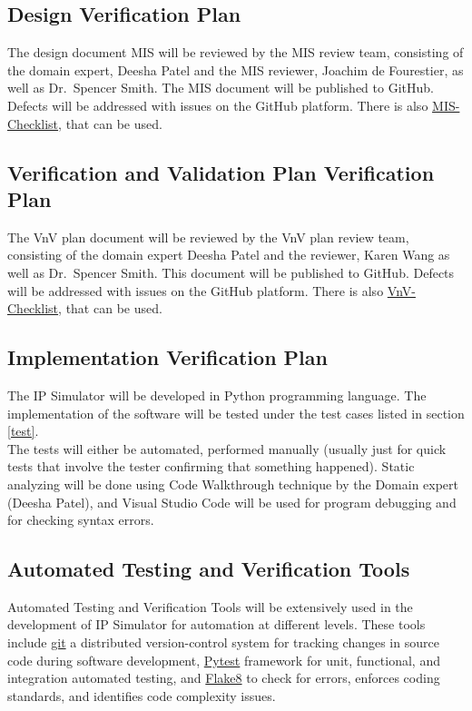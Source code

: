 \documentclass[12pt, titlepage]{article}
\begin{document}
\subsection{Design Verification Plan}

The design document MIS will be reviewed by the MIS review team, consisting of the domain expert, Deesha Patel and the MIS reviewer, Joachim de Fourestier, as well as Dr.\ Spencer Smith.
The MIS document will be published to GitHub. Defects will be addressed with issues on the GitHub platform. There is also \href{https://github.com/smiths/capTemplate/blob/main/docs/Checklists/MIS-Checklist.pdf}{MIS-Checklist}, that can be used.

\subsection{Verification and Validation Plan Verification Plan}
The VnV plan document will be reviewed by the VnV plan review team, consisting of the domain expert Deesha Patel and the reviewer, Karen Wang as well as Dr.\ Spencer Smith.
This document will be published to GitHub. Defects will be addressed with issues on the GitHub platform.
There is also \href{https://github.com/smiths/capTemplate/blob/main/docs/Checklists/VnV-Checklist.pdf}{VnV-Checklist}, that can be used.

\subsection{Implementation Verification Plan}

The IP Simulator will be developed in Python programming language. The implementation of the software will be tested under the test cases listed in section \ref{test}.\\
The tests will either be automated, performed manually (usually just for quick tests that involve the tester confirming that something happened). Static analyzing will be done using Code Walkthrough technique by the Domain expert (Deesha Patel), and Visual Studio Code will be used for program debugging and for checking syntax errors. \\
 
\subsection{Automated Testing and Verification Tools}

Automated Testing and Verification Tools will be extensively used in the development of IP Simulator for automation at different levels. These tools include \href{https://github.com/MinMah23/CAS741-Project}{git} a distributed version-control system for tracking changes in source code during software development, \href{https://docs.pytest.org/en/7.2.x/}{Pytest} framework for unit, functional, and integration automated testing, and \href{https://flake8.pycqa.org/en/latest/}{Flake8} to check for errors, enforces coding standards, and identifies code complexity issues.
\end{document}
